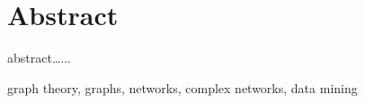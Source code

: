 \section*{Abstract}
{\small\indent abstract\ldots...}

\vspace{4ex}
{\small graph theory, graphs, networks, complex networks, data mining}
